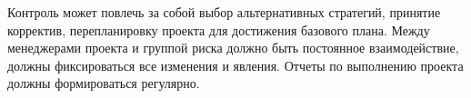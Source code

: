 Контроль может повлечь за собой выбор альтернативных стратегий, принятие корректив, перепланировку проекта для достижения базового плана. Между менеджерами проекта и группой риска должно быть постоянное взаимодействие, должны фиксироваться все изменения и явления. Отчеты по выполнению проекта должны формироваться регулярно.





















